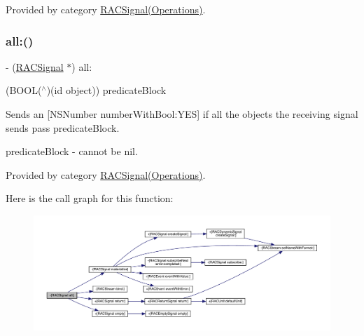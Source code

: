 Provided by category \mbox{\hyperlink{category_r_a_c_signal_07_operations_08_a51c08c7a357f83c96c468a6aa13d4d87}{R\+A\+C\+Signal(\+Operations)}}.

\mbox{\label{interface_r_a_c_signal_adb70e0b813cec0b7bcc5c76f2f3cd88f}} 
\subsubsection{\texorpdfstring{all\+:()}{all:()}\hspace{0.1cm}{\footnotesize\ttfamily [1/3]}}
{\footnotesize\ttfamily -\/ (\mbox{\hyperlink{interface_r_a_c_signal}{R\+A\+C\+Signal}} $\ast$) all\+: \begin{DoxyParamCaption}\item[{(B\+O\+OL($^\wedge$)(id object))}]{predicate\+Block }\end{DoxyParamCaption}}

Sends an \mbox{[}N\+S\+Number number\+With\+Bool\+:Y\+ES\mbox{]} if all the objects the receiving signal sends pass {\ttfamily predicate\+Block}.

predicate\+Block -\/ cannot be nil. 

Provided by category \mbox{\hyperlink{category_r_a_c_signal_07_operations_08_adb70e0b813cec0b7bcc5c76f2f3cd88f}{R\+A\+C\+Signal(\+Operations)}}.

Here is the call graph for this function\+:\nopagebreak
\begin{figure}[H]
\begin{center}
\leavevmode
\includegraphics[width=350pt]{interface_r_a_c_signal_adb70e0b813cec0b7bcc5c76f2f3cd88f_cgraph}
\end{center}
\end{figure}
\mbox{\label{interface_r_a_c_signal_adb70e0b813cec0b7bcc5c76f2f3cd88f}} 
